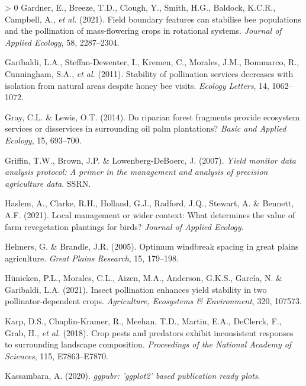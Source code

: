 \documentclass[]{elsarticle} %
\newlength{\cslhangindent}
\newenvironment{CSLReferences}[3] %
 {%
  \setlength{\parindent}{0pt}
  \ifodd #1 \everypar{\setlength{\hangindent}{\cslhangindent}}\ignorespaces\fi
  \ifnum #2 > 0
  \setlength{\parskip}{#2\baselineskip}
  \fi
 }%
 {}
\begin{document}
\begin{CSLReferences}{1}{0}
\leavevmode\hypertarget{ref-gardner2021}{}%
Gardner, E., Breeze, T.D., Clough, Y., Smith, H.G., Baldock, K.C.R., Campbell, A., \emph{et al.} (2021). Field boundary features can stabilise bee populations and the pollination of mass-flowering crops in rotational systems. \emph{Journal of Applied Ecology}, 58, 2287--2304.

\leavevmode\hypertarget{ref-garibaldi2011}{}%
Garibaldi, L.A., Steffan-Dewenter, I., Kremen, C., Morales, J.M., Bommarco, R., Cunningham, S.A., \emph{et al.} (2011). Stability of pollination services decreases with isolation from natural areas despite honey bee visits. \emph{Ecology Letters}, 14, 1062--1072.

\leavevmode\hypertarget{ref-gray2014}{}%
Gray, C.L. \& Lewis, O.T. (2014). Do riparian forest fragments provide ecosystem services or disservices in surrounding oil palm plantations? \emph{Basic and Applied Ecology}, 15, 693--700.

\leavevmode\hypertarget{ref-griffin2007}{}%
Griffin, T.W., Brown, J.P. \& Lowenberg-DeBoerc, J. (2007). \emph{Yield monitor data analysis protocol: A primer in the management and analysis of precision agriculture data}. SSRN.

\leavevmode\hypertarget{ref-haslem2021}{}%
Haslem, A., Clarke, R.H., Holland, G.J., Radford, J.Q., Stewart, A. \& Bennett, A.F. (2021). Local management or wider context: What determines the value of farm revegetation plantings for birds? \emph{Journal of Applied Ecology}.

\leavevmode\hypertarget{ref-helmers2005}{}%
Helmers, G. \& Brandle, J.R. (2005). Optimum windbreak spacing in great plains agriculture. \emph{Great Plains Research}, 15, 179--198.

\leavevmode\hypertarget{ref-hunicken2021}{}%
Hünicken, P.L., Morales, C.L., Aizen, M.A., Anderson, G.K.S., García, N. \& Garibaldi, L.A. (2021). Insect pollination enhances yield stability in two pollinator-dependent crops. \emph{Agriculture, Ecosystems {\&} Environment}, 320, 107573.

\leavevmode\hypertarget{ref-karp2018}{}%
Karp, D.S., Chaplin-Kramer, R., Meehan, T.D., Martin, E.A., DeClerck, F., Grab, H., \emph{et al.} (2018). Crop pests and predators exhibit inconsistent responses to surrounding landscape composition. \emph{Proceedings of the National Academy of Sciences}, 115, E7863--E7870.

\leavevmode\hypertarget{ref-kassambara2020}{}%
Kassambara, A. (2020). \emph{{ggpubr}: 'ggplot2' based publication ready plots}.


\end{CSLReferences}
\end{document}
